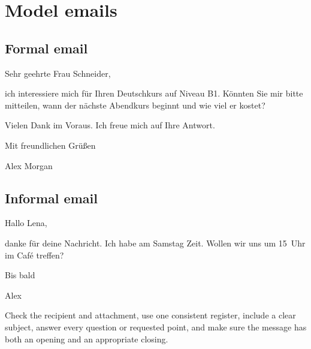 \section{Model emails}

\subsection{Formal email}

\begin{tcolorbox}[
  colback=referenceBlueBg,
  colframe=genderMasculine,
  title={Anfrage zum B1-Abendkurs},
  fonttitle=\bfseries
]
Sehr geehrte Frau Schneider,

\medskip
ich interessiere mich für Ihren Deutschkurs auf Niveau B1. Könnten Sie mir
bitte mitteilen, wann der nächste Abendkurs beginnt und wie viel er kostet?

\medskip
Vielen Dank im Voraus. Ich freue mich auf Ihre Antwort.

\medskip
Mit freundlichen Grüßen

Alex Morgan
\end{tcolorbox}

\subsection{Informal email}

\begin{tcolorbox}[
  colback=referenceRedBg,
  colframe=genderFeminine,
  title={Treffen am Samstag},
  fonttitle=\bfseries
]
Hallo Lena,

\medskip
danke für deine Nachricht. Ich habe am Samstag Zeit. Wollen wir uns um
15~Uhr im Café treffen?

\medskip
Bis bald

Alex
\end{tcolorbox}

\begin{tcolorbox}[
  colback=referenceGreenBg,
  colframe=genderNeuter,
  title={Final check before sending},
  fonttitle=\bfseries
]
Check the recipient and attachment, use one consistent register, include a
clear subject, answer every question or requested point, and make sure the
message has both an opening and an appropriate closing.
\end{tcolorbox}
